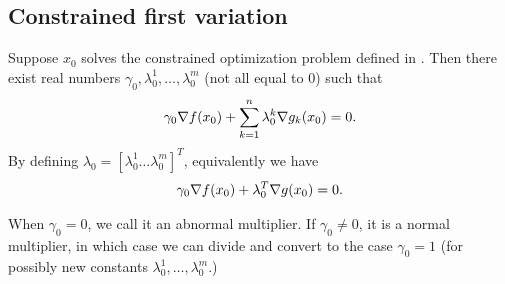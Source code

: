 \subsection{Constrained first variation}

\begin{theorem}
Suppose $x_0$ solves the constrained optimization problem defined in .
Then there exist real numbers $\gamma_0, \lambda_0^1, \dots, \lambda_0^m$ (not all equal to 0) such that
\begin{align}
\gamma_0 \nabla f(x_0) + \sum_{k=1}^{n} \lambda_0^k \nabla g_k(x_0) = 0.
\end{align}
By defining $\lambda_0 = [ \lambda_0^1 \dots \lambda_0^m ]^T$, equivalently we have
\begin{align}
\gamma_0 \grad f(x_0) + \lambda_0^T \grad g(x_0) = 0. \labeq{FJcfvf_mat}
\end{align}
\end{theorem}

\begin{remark}
When $\gamma_0 = 0$, we call it an abnormal multiplier.
If $\gamma_0 \neq 0$, it is a normal multiplier, in which case we can divide and convert to the case $\gamma_0 = 1$ (for possibly new constants $\lambda_0^1, \dots, \lambda_0^m$.)
\end{remark}

